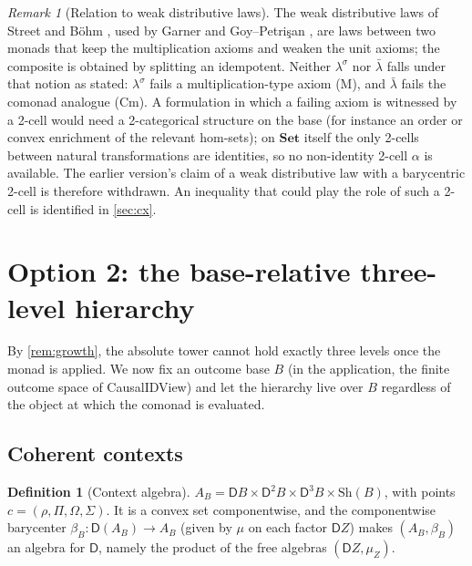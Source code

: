 \documentclass[11pt]{article}
\theoremstyle{definition}
\newtheorem{definition}[theorem]{Definition}
\theoremstyle{remark}
\newtheorem{remark}[theorem]{Remark}
\newcommand{\D}{\mathsf{D}}
\newcommand{\Set}{\mathbf{Set}}
\newcommand{\Sh}{\mathrm{Sh}}
\newcommand{\lb}{\bar\lambda}
\newcommand{\ls}{\lambda^{\sigma}}
\begin{document}
\begin{remark}[Relation to weak distributive laws]\label{rem:weak}
The weak distributive laws of Street and B\"ohm \cite{Street2009,Bohm2010,BohmLackStreet2011}, used by
Garner \cite{Garner2020} and Goy--Petri\c{s}an \cite{GoyPetrisan2020}, are laws between two monads
that keep the multiplication axioms and weaken the unit axioms; the composite is obtained by
splitting an idempotent. Neither $\ls$ nor $\lb$ falls under that notion as stated: $\ls$ fails a
multiplication-type axiom (M), and $\lb$ fails the comonad analogue (Cm). A formulation in which a
failing axiom is witnessed by a 2-cell would need a 2-categorical structure on the base (for instance
an order or convex enrichment of the relevant hom-sets); on $\Set$ itself the only 2-cells between
natural transformations are identities, so no non-identity 2-cell $\alpha$ is available. The earlier
version's claim of a weak distributive law with a barycentric 2-cell is therefore withdrawn. An
inequality that could play the role of such a 2-cell is identified in \cref{sec:cx}.
\end{remark}

\section{Option 2: the base-relative three-level hierarchy}\label{sec:relative}

By \cref{rem:growth}, the absolute tower cannot hold exactly three levels once the monad is applied.
We now fix an outcome base $B$ (in the application, the finite outcome space of CausalIDView) and let
the hierarchy live over $B$ regardless of the object at which the comonad is evaluated.

\subsection{Coherent contexts}

\begin{definition}[Context algebra]
$A_B=\D B\times\D^2B\times\D^3B\times\Sh(B)$, with points $c=(\rho,\Pi,\Omega,\Sigma)$. It is a convex
set componentwise, and the componentwise barycenter $\beta_B\colon\D(A_B)\to A_B$ (given by $\mu$ on
each factor $\D Z$) makes $(A_B,\beta_B)$ an algebra for $\D$, namely the product of the free algebras
$(\D Z,\mu_Z)$.
\end{definition}
\end{document}
